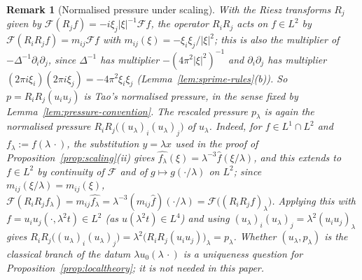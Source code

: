 \documentclass[11pt]{article}
\newtheorem{remark}[theorem]{Remark}
\theoremstyle{definition}
\theoremstyle{plain}
\begin{document}
\begin{remark}[Normalised pressure under scaling]\label{rem:scaling-pressure}
With the Riesz transforms $R_j$ given by $\mathcal F(R_jf)=-i\xi_j|\xi|^{-1}\mathcal Ff$,
the operator $R_iR_j$ acts on $f\in L^2$ by
$\mathcal F(R_iR_jf)=m_{ij}\mathcal Ff$ with $m_{ij}(\xi)=-\xi_i\xi_j/|\xi|^2$;
this is also the multiplier of $-\Delta^{-1}\partial_i\partial_j$, since
$\Delta^{-1}$ has multiplier $-(4\pi^2|\xi|^2)^{-1}$ and
$\partial_i\partial_j$ has multiplier $(2\pi i\xi_i)(2\pi i\xi_j)=-4\pi^2\xi_i\xi_j$
(Lemma~\ref{lem:sprime-rules}(b)).  So $p=R_iR_j(u_iu_j)$ is Tao's normalised
pressure, in the sense fixed by Lemma~\ref{lem:pressure-convention}.
The rescaled pressure $p_\lambda$ is again the normalised
pressure $R_iR_j\bigl((u_\lambda)_i(u_\lambda)_j\bigr)$ of $u_\lambda$.
Indeed, for $f\in L^1\cap L^2$ and $f_\lambda:=f(\lambda\,\cdot)$, the
substitution $y=\lambda x$ used in the proof of
Proposition~\ref{prop:scaling}(ii) gives
$\widehat{f_\lambda}(\xi)=\lambda^{-3}\hat f(\xi/\lambda)$, and this
extends to $f\in L^2$ by continuity of $\mathcal F$ and of $g\mapsto g(\cdot/\lambda)$
on $L^2$; since $m_{ij}(\xi/\lambda)=m_{ij}(\xi)$,
$\mathcal F(R_iR_jf_\lambda)=m_{ij}\widehat{f_\lambda}
=\lambda^{-3}(m_{ij}\hat f)(\cdot/\lambda)=\mathcal F\bigl((R_iR_jf)_\lambda\bigr)$.
Applying this with $f=u_iu_j(\cdot,\lambda^2t)\in L^2$ (as
$u(\lambda^2t)\in L^4$) and using $(u_\lambda)_i(u_\lambda)_j
=\lambda^2(u_iu_j)_\lambda$ gives
$R_iR_j\bigl((u_\lambda)_i(u_\lambda)_j\bigr)
=\lambda^2\bigl(R_iR_j(u_iu_j)\bigr)_\lambda=p_\lambda$.
Whether $(u_\lambda,p_\lambda)$ is the classical branch of the datum
$\lambda u_0(\lambda\,\cdot)$ is a uniqueness question for
Proposition~\ref{prop:localtheory}; it is not needed in this paper.
\end{remark}
\end{document}
